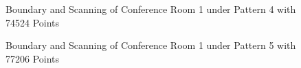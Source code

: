 \documentclass[11pt, a4paper,oneside,chapterprefix=false]{scrbook}
\begin{document}
\begin{figure}[H]
    \centering
      \label{fig:conf1 b 4} \hfill
     \label{fig:conf1 s 200 4}
    \caption{Boundary and Scanning of Conference Room 1 under Pattern 4 with 74524 Points}
    \label{fig:conf1 4}
\end{figure}

\vspace{80pt}

\begin{figure}[H]
    \centering
      \label{fig:conf1 b 5} \hfill
     \label{fig:conf1 s 5}
    \caption{Boundary and Scanning of Conference Room 1 under Pattern 5 with 77206 Points}
    \label{fig:conf1 5}
\end{figure}
\end{document}
